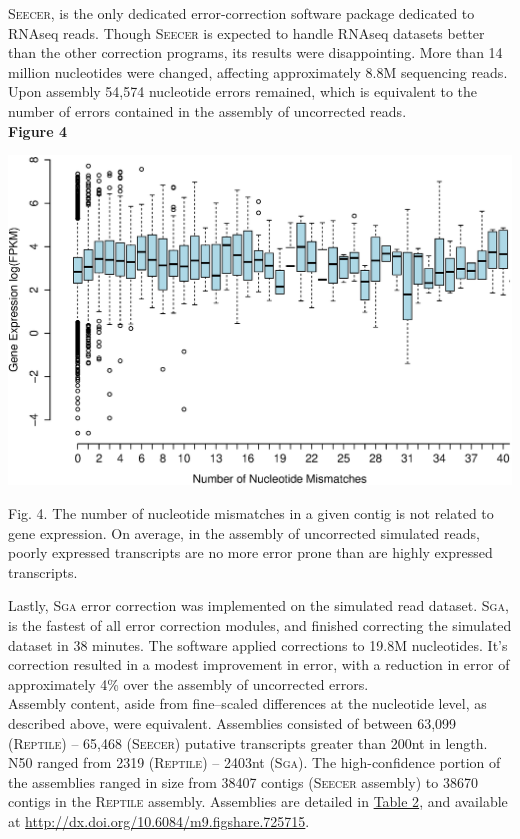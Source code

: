 \documentclass[11pt]{article}
\begin{document}
\noindent
\textsc{Seecer}, is the only dedicated error-correction software package dedicated to RNAseq reads. Though \textsc{Seecer} is expected to handle RNAseq datasets better than the other correction programs, its results were disappointing. More than 14 million nucleotides were changed, affecting approximately 8.8M sequencing reads.  Upon assembly 54,574 nucleotide errors remained, which is equivalent to the number of errors contained in the assembly of uncorrected reads.   \\

\textbf{\hypertarget{Figure 4}{Figure 4}} \\
\centerline{\includegraphics[width=22.0\baselineskip]{Figure3.eps}}
\begin{changemargin}{2cm}{2cm}
\noindent
Fig. 4. The number of nucleotide mismatches in a given contig is not related to gene expression. On average, in the assembly of uncorrected simulated reads, poorly expressed transcripts are no more error prone than are highly expressed transcripts.
\end{changemargin}
\vspace{10mm}

\noindent 
Lastly, \textsc{Sga} error correction was implemented on the simulated read dataset. \textsc{Sga}, is the fastest of all error correction modules, and finished correcting the simulated dataset in 38 minutes.  The software applied corrections to 19.8M nucleotides.  It's correction resulted in a modest improvement in error, with a reduction in error of approximately 4\% over the assembly of uncorrected errors.  \\
 
\noindent
Assembly content, aside from fine--scaled differences at the nucleotide level, as described above, were equivalent. Assemblies consisted of between 63,099 (\textsc{Reptile}) -- 65,468 (\textsc{Seecer}) putative transcripts greater than 200nt in length. N50 ranged from 2319 (\textsc{Reptile}) -- 2403nt (\textsc{Sga}).  The high-confidence portion of the assemblies ranged in size from 38407 contigs (\textsc{Seecer} assembly) to 38670 contigs in the \textsc{Reptile} assembly. Assemblies are detailed in \hyperlink{Table 2}{Table 2}, and available at \url{http://dx.doi.org/10.6084/m9.figshare.725715}. \\
\end{document}
